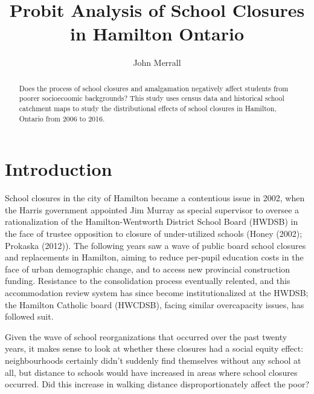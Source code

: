 \documentclass[]{elsarticle} %
\begin{document}
\begin{frontmatter}

  \title{Probit Analysis of School Closures in Hamilton Ontario}
    \author[School of Geography and Earth Sciences, McMaster University]{John Merrall}
      \address[School of Geography and Earth Sciences, McMaster University]{General Sciences Rm. 206, McMaster University, 1280 Main Street West,
Hamilton, Ontario L8S 4K1}
  
  \begin{abstract}
  Does the process of school closures and amalgamation negatively affect
  students from poorer socioecoomic backgrounds? This study uses census
  data and historical school catchment maps to study the distributional
  effects of school closures in Hamilton, Ontario from 2006 to 2016.
  \end{abstract}
  
 \end{frontmatter}

\hypertarget{introduction}{%
\section{Introduction}\label{introduction}}

School closures in the city of Hamilton became a contentious issue in
2002, when the Harris government appointed Jim Murray as special
supervisor to oversee a rationalization of the Hamilton-Wentworth
District School Board (HWDSB) in the face of trustee opposition to
closure of under-utilized schools (Honey (2002); Prokaska (2012)). The
following years saw a wave of public board school closures and
replacements in Hamilton, aiming to reduce per-pupil education costs in
the face of urban demographic change, and to access new provincial
construction funding. Resistance to the consolidation process eventually
relented, and this accommodation review system has since become
institutionalized at the HWDSB; the Hamilton Catholic board (HWCDSB),
facing similar overcapacity issues, has followed suit.

Given the wave of school reorganizations that occurred over the past
twenty years, it makes sense to look at whether these closures had a
social equity effect: neighbourhoods certainly didn't suddenly find
themselves without any school at all, but distance to schools would have
increased in areas where school closures occurred. Did this increase in
walking distance disproportionately affect the poor?
\end{document}

